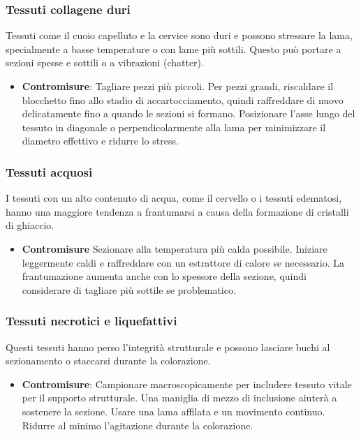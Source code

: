 \subsubsection{Tessuti collagene duri}
Tessuti come il cuoio capelluto e la cervice sono duri e possono stressare la lama, specialmente a basse temperature o con lame più sottili.  Questo può portare a sezioni spesse e sottili o a vibrazioni (chatter).
\begin{itemize}
    \item   \textbf{Contromisure}: Tagliare pezzi più piccoli.  Per pezzi grandi, riscaldare il blocchetto fino allo stadio di accartocciamento, quindi raffreddare di nuovo delicatamente fino a quando le sezioni si formano.  Posizionare l'asse lungo del tessuto in diagonale o perpendicolarmente alla lama per minimizzare il diametro effettivo e ridurre lo stress. 
\end{itemize}

\subsubsection{Tessuti acquosi}
I tessuti con un alto contenuto di acqua, come il cervello o i tessuti edematosi, hanno una maggiore tendenza a frantumarsi a causa della formazione di cristalli di ghiaccio. 
\begin{itemize}
    \item   \textbf{Contromisure} Sezionare alla temperatura più calda possibile.  Iniziare leggermente caldi e raffreddare con un estrattore di calore se necessario.  La frantumazione aumenta anche con lo spessore della sezione, quindi considerare di tagliare più sottile se problematico. 
\end{itemize}

\subsubsection{Tessuti necrotici e liquefattivi}
Questi tessuti hanno perso l'integrità strutturale e possono lasciare buchi al sezionamento o staccarsi durante la colorazione. 
\begin{itemize}
    \item   \textbf{Contromisure}: Campionare macroscopicamente per includere tessuto vitale per il supporto strutturale.  Una maniglia di mezzo di inclusione aiuterà a sostenere la sezione. Usare una lama affilata e un movimento continuo.  Ridurre al minimo l'agitazione durante la colorazione.
\end{itemize}

